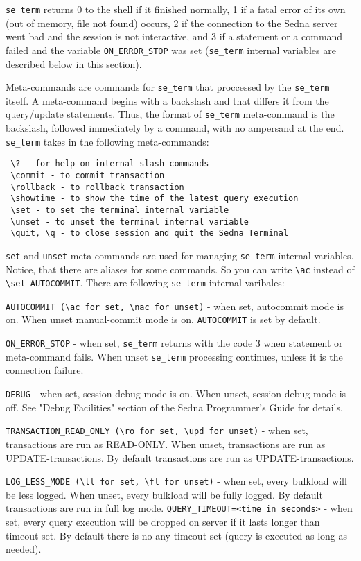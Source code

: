 \documentclass[a4paper,12pt]{article}
\begin{document}
\verb!se_term! returns 0 to the shell if it finished normally, 1 if a fatal error of its own (out of memory, file not
found) occurs, 2 if the connection to the Sedna server went bad and the session is not interactive, and 3 if
a statement or a command failed and the variable \verb!ON_ERROR_STOP! was set (\verb!se_term! internal variables are described below in this section).

Meta-commands are commands for \verb!se_term! that proccessed by the \verb!se_term! itself.
A meta-command begins with a backslash and that differs it from the query/update statements.
Thus, the format of \verb!se_term! meta-command is the backslash, followed immediately by a command, with no ampersand at the end.
\verb!se_term! takes in the following meta-commands:

\begin{verbatim}
 \? - for help on internal slash commands
 \commit - to commit transaction
 \rollback - to rollback transaction
 \showtime - to show the time of the latest query execution
 \set - to set the terminal internal variable
 \unset - to unset the terminal internal variable
 \quit, \q - to close session and quit the Sedna Terminal
\end{verbatim}

\verb!set! and \verb!unset! meta-commands are used for managing \verb!se_term! internal variables.
Notice, that there are aliases for some commands. So you can write \verb!\ac! instead of \verb!\set AUTOCOMMIT!.
There are following \verb!se_term! internal varibales:

\verb!AUTOCOMMIT (\ac for set, \nac for unset)! - when set, autocommit mode is on. When unset manual-commit mode is on. \verb!AUTOCOMMIT! is set by default.

\verb!ON_ERROR_STOP! - when set, \verb!se_term! returns with the code 3 when statement or meta-command fails. When unset \verb!se_term! processing continues, unless it is the connection failure.

\verb!DEBUG! - when set, session debug mode is on. When unset, session debug mode is off. See "Debug Facilities" section of the Sedna Programmer's Guide for details.

\verb!TRANSACTION_READ_ONLY (\ro for set, \upd for unset)! - when set, transactions are run as READ-ONLY. When unset, transactions are run as UPDATE-transactions. By default transactions are run as UPDATE-transactions.

\verb!LOG_LESS_MODE (\ll for set, \fl for unset)! -  when set, every bulkload will be less logged. When unset, every bulkload will be fully logged. By default transactions are run in full log mode.
\verb!QUERY_TIMEOUT=<time in seconds>! - when set, every query execution will be dropped on server if it lasts longer than timeout set. By default there is no any timeout set (query is executed as long as needed).
\end{document}

